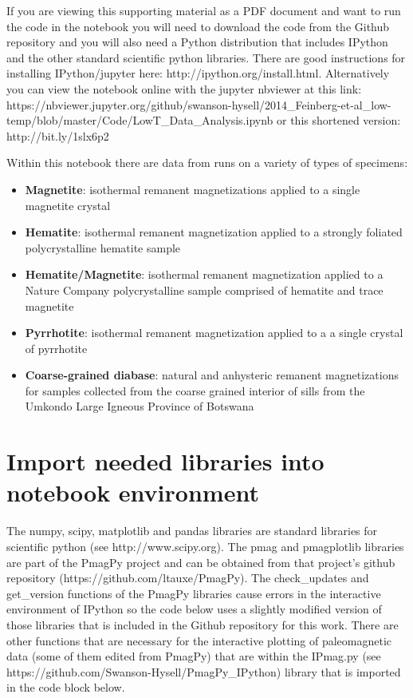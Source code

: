 \documentclass{article}
\begin{document}
If you are viewing this supporting material as a PDF document and want
to run the code in the notebook you will need to download the code from
the Github repository and you will also need a Python distribution that
includes IPython and the other standard scientific python libraries.
There are good instructions for installing IPython/jupyter here:
http://ipython.org/install.html. Alternatively you can view the notebook
online with the jupyter nbviewer at this link:
https://nbviewer.jupyter.org/github/swanson-hysell/2014\_Feinberg-et-al\_low-temp/blob/master/Code/LowT\_Data\_Analysis.ipynb
or this shortened version: http://bit.ly/1slx6p2

Within this notebook there are data from runs on a variety of types of
specimens:

\begin{itemize}
\itemsep1pt\parskip0pt
\item
  \textbf{Magnetite}: isothermal remanent magnetizations applied to a
  single magnetite crystal
\item
  \textbf{Hematite}: isothermal remanent magnetization applied to a
  strongly foliated polycrystalline hematite sample
\item
  \textbf{Hematite/Magnetite}: isothermal remanent magnetization applied
  to a Nature Company polycrystalline sample comprised of hematite and
  trace magnetite
\item
  \textbf{Pyrrhotite}: isothermal remanent magnetization applied to a a
  single crystal of pyrrhotite
\item
  \textbf{Coarse-grained diabase}: natural and anhysteric remanent
  magnetizations for samples collected from the coarse grained interior
  of sills from the Umkondo Large Igneous Province of Botswana
\end{itemize}


    \section{Import needed libraries into notebook environment}


    The numpy, scipy, matplotlib and pandas libraries are standard libraries
for scientific python (see http://www.scipy.org). The pmag and
pmagplotlib libraries are part of the PmagPy project and can be obtained
from that project's github repository
(https://github.com/ltauxe/PmagPy). The check\_updates and get\_version
functions of the PmagPy libraries cause errors in the interactive
environment of IPython so the code below uses a slightly modified
version of those libraries that is included in the Github repository for
this work. There are other functions that are necessary for the
interactive plotting of paleomagnetic data (some of them edited from
PmagPy) that are within the IPmag.py (see
https://github.com/Swanson-Hysell/PmagPy\_IPython) library that is
imported in the code block below.
\end{document}
